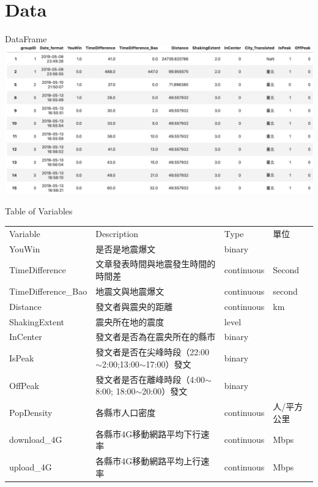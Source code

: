 \section{Data}

\begin{frame}[fragile]{DataFrame}
	\includegraphics[width=1\textwidth]{Images/data.png}
\end{frame}


\begin{frame}[fragile]{Table of Variables}

\begin{table}[htbp]
\tiny
\begin{tabular}{llll}
Variable            & Description                                      & Type       & 單位     \\
YouWin              & 是否是地震爆文                                          & binary     &        \\
TimeDifference      & 文章發表時間與地震發生時間的時間差                                & continuous & Second \\
TimeDifference\_Bao & 地震文與地震爆文                                         & continuous & second \\
Distance            & 發文者與震央的距離                                        & continuous & km     \\
ShakingExtent       & 震央所在地的震度                                         & level      &        \\
InCenter            & 發文者是否為在震央所在的縣市                                   & binary     &        \\
IsPeak              & 發文者是否在尖峰時段（22:00$\sim$2:00;13:00$\sim$17:00）發文 & binary     &        \\
OffPeak             & 發文者是否在離峰時段（4:00$\sim$8:00; 18:00$\sim$20:00）發文 & binary     &        \\
PopDensity          & 各縣市人口密度                                          & continuous & 人/平方公里 \\
download\_4G        & 各縣市4G移動網路平均下行速率                                  & continuous & Mbps   \\
upload\_4G          & 各縣市4G移動網路平均上行速率                                  & continuous & Mbps  
\end{tabular}

\end{table}
\end{frame}


